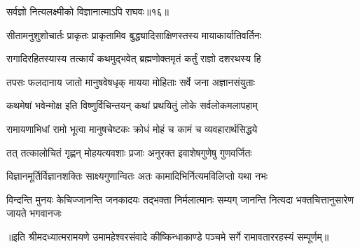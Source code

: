 



{सर्वज्ञो नित्यलक्ष्मीको विज्ञानात्माऽपि राघवः॥१६॥} %

\addtocounter{shlokacount}{17}

\twolineshloka
{सीतामनुशुशोचार्तः प्राकृतः प्राकृतामिव}
{बुद्ध्यादिसाक्षिणस्तस्य मायाकार्यातिवर्तिनः} %

\twolineshloka
{रागादिरहितस्यास्य तत्कार्यं कथमुद्भवेत्}
{ब्रह्मणोक्तमृतं कर्तुं राज्ञो दशरथस्य हि} %

\twolineshloka
{तपसः फलदानाय जातो मानुषवेषधृक्}
{मायया मोहिताः सर्वे जना अज्ञानसंयुताः} %

\twolineshloka
{कथमेषां भवेन्मोक्ष इति विष्णुर्विचिन्तयन्}
{कथां प्रथयितुं लोके सर्वलोकमलापहाम्} %

\twolineshloka
{रामायणाभिधां रामो भूत्वा मानुषचेष्टकः}
{क्रोधं मोहं च कामं च व्यवहारार्थसिद्धये} %

\twolineshloka
{तत् तत्कालोचितं गृह्णन् मोहयत्यवशाः प्रजाः}
{अनुरक्त इवाशेषगुणेषु गुणवर्जितः} %

\twolineshloka
{विज्ञानमूर्तिर्विज्ञानशक्तिः साक्ष्यगुणान्वितः}
{अतः कामादिभिर्नित्यमविलिप्तो यथा नभः} %

\threelineshloka
{विन्दन्ति मुनयः केचिज्जानन्ति जनकादयः}
{तद्भक्ता निर्मलात्मानः सम्यग् जानन्ति नित्यदा}
{भक्तचित्तानुसारेण जायते भगवानजः} %

{॥इति श्रीमदध्यात्मरामयणे उमामहेश्वरसंवादे
कीष्किन्धाकाण्डे पञ्चमे सर्गे  रामावताररहस्यं सम्पूर्णम्॥}
